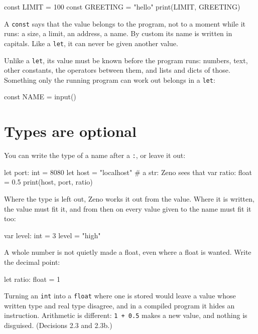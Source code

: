 \begin{zeno}
const LIMIT = 100
const GREETING = "hello"
print(LIMIT, GREETING)
\end{zeno}

A \verb|const| says that the value belongs to the program, not to a
moment while it runs: a size, a limit, an address, a name. By custom
its name is written in capitals. Like a \verb|let|, it can never be
given another value.

Unlike a \verb|let|, its value must be known before the program runs:
numbers, text, other constants, the operators between them, and lists
and dicts of those. Something only the running program can work out
belongs in a \verb|let|:

\begin{zeno}[fails=yes]
const NAME = input()
\end{zeno}

\section{Types are optional}

You can write the type of a name after a \verb|:|, or leave it out:

\begin{zeno}
let port: int = 8080
let host = "localhost"          # a str: Zeno sees that
var ratio: float = 0.5
print(host, port, ratio)
\end{zeno}

Where the type is left out, Zeno works it out from the value. Where it
is written, the value must fit it, and from then on every value given
to the name must fit it too:

\begin{zeno}[fails=yes]
var level: int = 3
level = "high"
\end{zeno}

A whole number is not quietly made a float, even where a float is
wanted. Write the decimal point:

\begin{zeno}[fails=yes]
let ratio: float = 1
\end{zeno}

\begin{why}
Turning an \verb|int| into a \verb|float| where one is stored would
leave a value whose written type and real type disagree, and in a
compiled program it hides an instruction. Arithmetic is different:
\verb|1 + 0.5| makes a new value, and nothing is disguised.
(Decisions 2.3 and 2.3b.)
\end{why}

